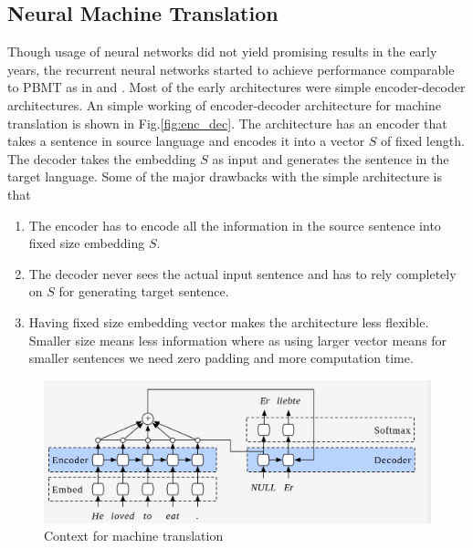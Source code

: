 \documentclass[conference]{IEEEtran}
\begin{document}
\subsection{Neural Machine Translation}
Though usage of neural networks did not yield promising results in the early years, the recurrent neural networks started to achieve performance comparable to PBMT as in \cite{kalchbrenner2013recurrent} and \cite{hermann2013multilingual}. Most of the early architectures were simple encoder-decoder architectures. An simple working of encoder-decoder architecture for machine translation is shown in Fig.\ref{fig:enc_dec}. The architecture has an encoder that takes a sentence in source language and encodes it into a vector $S$ of fixed length. The decoder takes the embedding $S$ as input and generates the sentence in the target language. Some of the major drawbacks with the simple architecture is that
\begin{enumerate}
 \item The encoder has to encode all the information in the source sentence into fixed size embedding $S$. 
 \item The decoder never sees the actual input sentence and has to rely completely on $S$ for generating target sentence. 
 \item Having fixed size embedding vector makes the architecture less flexible. Smaller size means less information where as using larger vector means for smaller sentences we need zero padding and more computation time.
\end{enumerate}


\begin{figure}
    \includegraphics[width=.99\linewidth]{img/context.png}  
    \caption{Context for machine translation} 
    \label{fig:
    
    }
\end{figure}
\end{document}

